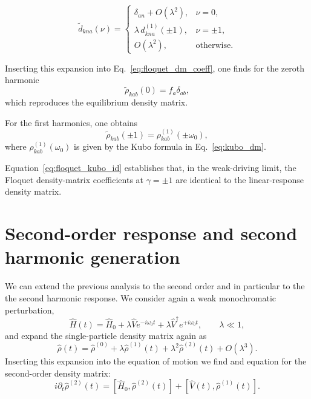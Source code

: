 \documentclass[aps,physrev,preprint,groupedaddress]{revtex4-2}
\renewcommand{\[}{\left[}
\renewcommand{\]}{\right]}
\renewcommand{\(}{\left(}
\renewcommand{\)}{\right)}
\begin{document}
\begin{equation}
\tilde d_{kna}(\nu)
=
\begin{cases}
\delta_{an} + O(\lambda^2), & \nu = 0, \\[4pt]
\lambda\, d^{(1)}_{kna}(\pm 1), & \nu = \pm 1, \\[4pt]
O(\lambda^2), & \text{otherwise}.
\end{cases}
\end{equation}

Inserting this expansion into Eq.~\eqref{eq:floquet_dm_coeff}, one finds for the zeroth harmonic
\begin{equation}
\tilde\rho_{kab}(0) = f_a \delta_{ab},
\end{equation}
which reproduces the equilibrium density matrix.

For the first harmonics, one obtains
\begin{equation}
\tilde\rho_{kab}(\pm 1)
=
\rho^{(1)}_{kab}(\pm\omega_0),
\label{eq:floquet_kubo_id}
\end{equation}
where $\rho^{(1)}_{kab}(\omega_0)$ is given by the Kubo formula in
Eq.~\eqref{eq:kubo_dm}.

Equation~\eqref{eq:floquet_kubo_id} establishes that, in the weak-driving limit, the Floquet
density-matrix coefficients at $\gamma=\pm1$ are identical to the linear-response density
matrix. 
\section{Second-order response and second harmonic generation}
\label{app:second_order}

We can extend the previous analysis to the second order and in particular to the the second harmonic response.
We consider again a weak monochromatic perturbation,
\begin{equation}
\hat H(t) = \hat H_0
+ \lambda \hat V e^{-i\omega_0 t}
+ \lambda \hat V^\dagger e^{+i\omega_0 t},
\qquad \lambda \ll 1 ,
\end{equation}
and expand the single-particle density matrix again as
\begin{equation}
\hat\rho(t)
=
\hat\rho^{(0)}
+
\lambda \hat\rho^{(1)}(t)
+
\lambda^2 \hat\rho^{(2)}(t)
+
O(\lambda^3).
\end{equation}
Inserting this expansion into the equation of motion we find and equation for the second-order density matrix:
\begin{equation}
i\partial_t \hat\rho^{(2)}(t)
=
[\hat H_0,\hat\rho^{(2)}(t)]
+
[\hat V(t),\hat\rho^{(1)}(t)].
\label{eq:dm_second_order_eom}
\end{equation}
\end{document}
